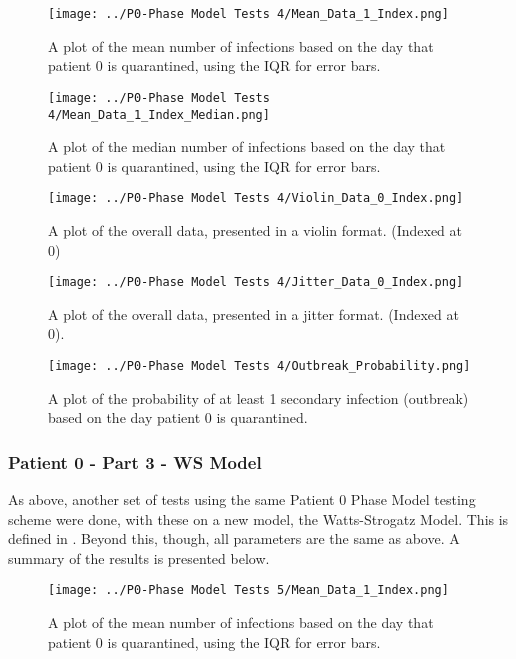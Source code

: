 \documentclass{article}
\numberwithin{equation}{section} %
\begin{document}
\begin{figure}[H]
  \centering
  \texttt{[image: ../P0-Phase Model Tests 4/Mean\_Data\_1\_Index.png]}
  \caption{A plot of the mean number of infections based on the day that patient 0 is quarantined, using the IQR for error bars.}
\end{figure}

\begin{figure}[H]
  \centering
  \texttt{[image: ../P0-Phase Model Tests 4/Mean\_Data\_1\_Index\_Median.png]}
  \caption{A plot of the median number of infections based on the day that patient 0 is quarantined, using the IQR for error bars.}
\end{figure}

\begin{figure}[H]
  \centering
  \texttt{[image: ../P0-Phase Model Tests 4/Violin\_Data\_0\_Index.png]}
  \caption{A plot of the overall data, presented in a violin format. (Indexed at 0)}
\end{figure}

\begin{figure}[H]
  \centering
  \texttt{[image: ../P0-Phase Model Tests 4/Jitter\_Data\_0\_Index.png]}
  \caption{A plot of the overall data, presented in a jitter format. (Indexed at 0).}
\end{figure}

\begin{figure}[H]
  \centering
  \texttt{[image: ../P0-Phase Model Tests 4/Outbreak\_Probability.png]}
  \caption{A plot of the probability of at least 1 secondary infection (outbreak) based on the day patient 0 is quarantined.}
\end{figure}

\begin{multicols}{2}
  \subsubsection{Patient 0 - Part 3 - WS Model}
  As above, another set of tests using the same Patient 0 Phase Model testing scheme were done, with these on a new model, the Watts-Strogatz Model. This is defined in . Beyond this, though, all parameters are the same as above. A summary of the results is presented below.
\end{multicols}

\begin{figure}[H]
  \centering
  \texttt{[image: ../P0-Phase Model Tests 5/Mean\_Data\_1\_Index.png]}
  \caption{A plot of the mean number of infections based on the day that patient 0 is quarantined, using the IQR for error bars.}
\end{figure}
\end{document}
